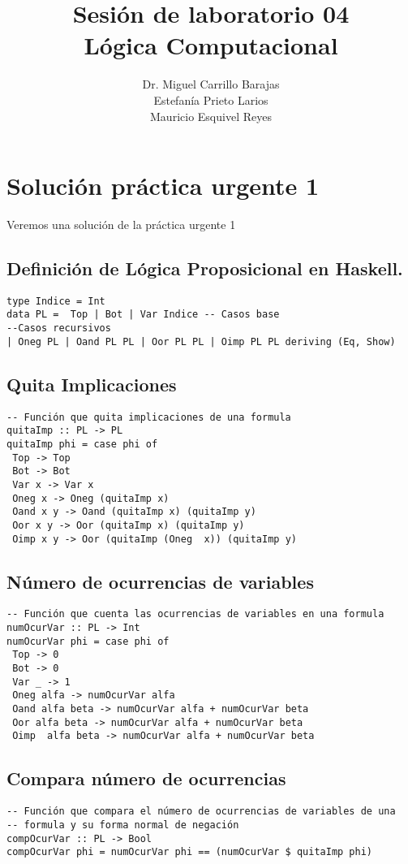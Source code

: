 \documentclass[11pt]{article}
\author{Dr. Miguel Carrillo Barajas \\
Estefanía Prieto Larios \\
Mauricio Esquivel Reyes \\
}
\date{}
\title{Sesión de laboratorio 04 \\
Lógica Computacional}
\begin{document}
\maketitle
\section{Solución práctica urgente 1}
\label{sec:org11e3858}
Veremos una solución de la práctica urgente 1
\subsection{Definición de Lógica Proposicional en Haskell.}
\label{sec:orgd4aa38d}
\begin{verbatim}
type Indice = Int
data PL =  Top | Bot | Var Indice -- Casos base
--Casos recursivos
| Oneg PL | Oand PL PL | Oor PL PL | Oimp PL PL deriving (Eq, Show)
\end{verbatim}
\subsection{Quita Implicaciones}
\label{sec:org99dd40e}
\begin{verbatim}
-- Función que quita implicaciones de una formula
quitaImp :: PL -> PL
quitaImp phi = case phi of
 Top -> Top
 Bot -> Bot
 Var x -> Var x
 Oneg x -> Oneg (quitaImp x)
 Oand x y -> Oand (quitaImp x) (quitaImp y)
 Oor x y -> Oor (quitaImp x) (quitaImp y)
 Oimp x y -> Oor (quitaImp (Oneg  x)) (quitaImp y)
\end{verbatim}
\subsection{Número de ocurrencias de variables}
\label{sec:org62bf225}
\begin{verbatim}
-- Función que cuenta las ocurrencias de variables en una formula
numOcurVar :: PL -> Int
numOcurVar phi = case phi of
 Top -> 0
 Bot -> 0
 Var _ -> 1
 Oneg alfa -> numOcurVar alfa
 Oand alfa beta -> numOcurVar alfa + numOcurVar beta
 Oor alfa beta -> numOcurVar alfa + numOcurVar beta
 Oimp  alfa beta -> numOcurVar alfa + numOcurVar beta
\end{verbatim}
\subsection{Compara número de ocurrencias}
\label{sec:org8ba5518}
\begin{verbatim}
-- Función que compara el número de ocurrencias de variables de una
-- formula y su forma normal de negación
compOcurVar :: PL -> Bool
compOcurVar phi = numOcurVar phi == (numOcurVar $ quitaImp phi)
\end{verbatim}
\end{document}
